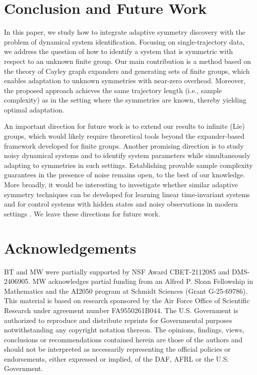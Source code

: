 \documentclass[11pt]{article}
\theoremstyle{plain}
\theoremstyle{definition}
\theoremstyle{remark}
\begin{document}
 

 



\section{Conclusion and Future Work}

In this paper, we study how to integrate adaptive symmetry discovery with the problem of dynamical system identification. Focusing on single-trajectory data, we address the question of how to identify a system that is symmetric with respect to an unknown finite group. Our main contribution is a method based on the theory of Cayley graph expanders and generating sets of finite groups, which enables adaptation to unknown symmetries with near-zero overhead. Moreover, the proposed approach achieves the same trajectory length (i.e., sample complexity) as in the setting where the symmetries are known, thereby yielding optimal adaptation.

An important direction for future work is to extend our results to infinite (Lie) groups, which would likely require theoretical tools beyond the expander-based framework developed for finite groups. Another promising direction is to study noisy dynamical systems and to identify system parameters while simultaneously adapting to symmetries in such settings. Establishing provable sample complexity guarantees in the presence of noise remains open, to the best of our knowledge. More broadly, it would be interesting to investigate whether similar adaptive symmetry techniques can be developed for learning linear time-invariant systems and for control systems with hidden states and noisy observations in modern settings \citep{hazan2025research}. We leave these directions for future work.





\section*{Acknowledgements}

BT and MW were partially supported by NSF Award CBET-2112085 and DMS-2406905. MW acknowledges partial funding from an Alfred P. Sloan Fellowship in Mathematics and the AI2050 program at Schmidt Sciences (Grant G-25-69786).
This material is based on research sponsored by the Air Force Office of Scientific Research under agreement number FA9550261B044. The U.S. Government is authorized to reproduce and distribute reprints for Governmental purposes notwithstanding any copyright notation thereon. The opinions, findings, views, conclusions or recommendations contained herein are those of the authors and should not be interpreted as necessarily representing the official policies or endorsements, either expressed or implied, of the DAF, AFRL or the U.S. Government.
 
\end{document}
